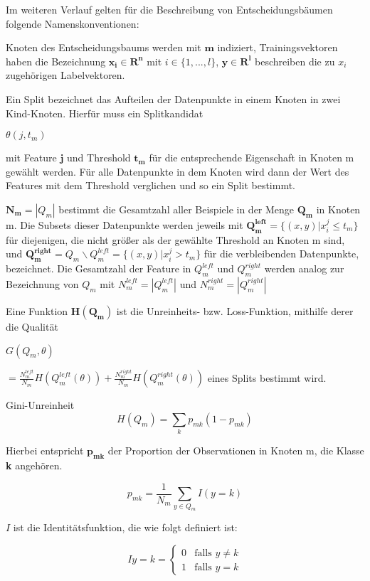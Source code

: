Im weiteren Verlauf gelten für die Beschreibung von Entscheidungsbäumen folgende Namenskonventionen:

Knoten des Entscheidungsbaums werden mit $\mathbf{m}$ indiziert, Trainingsvektoren haben die Bezeichnung $\mathbf{x_i \in R^n}$ mit $i \in \{1,...,l\}$, $\mathbf{y \in R^l}$ beschreiben die zu $x_i$ zugehörigen Labelvektoren. \cite{}

Ein Split bezeichnet das Aufteilen der Datenpunkte in einem Knoten in zwei Kind-Knoten. Hierfür muss ein Splitkandidat \begin{boldmath}$\theta(j, t_m)$\end{boldmath} mit Feature $\mathbf{j}$ und Threshold $\mathbf{t_m}$ für die entsprechende Eigenschaft in Knoten m gewählt werden. Für alle Datenpunkte in dem Knoten wird dann der Wert  des Features mit dem Threshold verglichen und so ein Split bestimmt. \cite{}

$\mathbf{N_m} = |Q_m|$ bestimmt die Gesamtzahl aller Beispiele in der Menge $\mathbf{Q_m}$ in Knoten m. Die Subsets dieser Datenpunkte werden jeweils mit $\mathbf{Q_m^{left}} = \{(x,y)| x_i^j \leq t_m\}$ für diejenigen, die nicht größer als der gewählte Threshold an Knoten m sind, und $\mathbf{Q_m^{right}} = Q_m \backslash Q_m^{left} = \{(x,y)| x_i^j > t_m\}$ für die verbleibenden Datenpunkte, bezeichnet. Die Gesamtzahl der Feature in $Q_m^{left}$ und  $Q_m^{right}$ werden analog zur Bezeichnung von  $Q_m$ mit $N_m^{left} = |Q_m^{left}|$ und $N_m^{right} = |Q_m^{right}|$ 
 \cite{}

Eine Funktion $\mathbf{H(Q_m)}$ ist die Unreinheits- bzw. Loss-Funktion, mithilfe derer die Qualität \begin{boldmath}$G(Q_m, \theta)$ \end{boldmath} $= \frac{N_m^{left}}{N_m} H(Q_m^{left}(\theta)) + \frac{N_m^{right}}{N_m} H(Q_m^{right}(\theta))$ eines Splits bestimmt wird. \cite{}

\begin{definition}
	Gini-Unreinheit
	\[H(Q_m)= \sum_k p_{mk} (1-p_{mk})\]
	
	Hierbei entspricht $\mathbf{p_{mk}}$ der Proportion der Observationen in Knoten m, die Klasse \textbf{k} angehören.
	
	\[p_{mk} = \frac{1}{N_m} \sum_{y \in Q_m} I(y=k)\]
	
	$I$ ist die Identitätsfunktion, die wie folgt definiert ist:
	
	\[I{y = k} = \begin{cases}
		0 & \text{falls } y \neq k \\
		1 & \text{falls } y = k
	\end{cases}\]
	
\end{definition}

